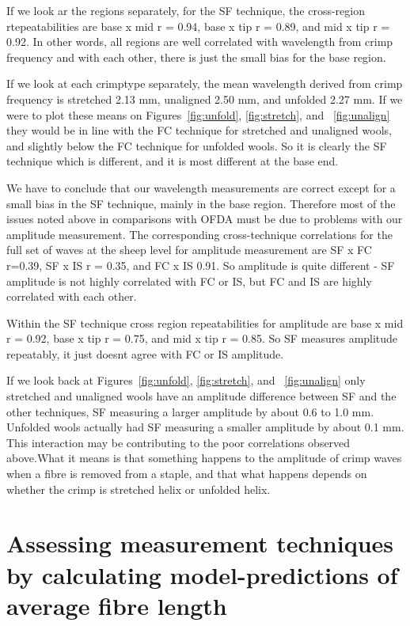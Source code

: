 \documentclass[titlepage,10pt]{article}  %
\begin{document}
If we look ar the regions separately, for the SF technique, the cross-region rtepeatabilities are base x mid r = 0.94, base x tip r = 0.89, and mid x tip r = 0.92. In other words, all regions are well correlated with wavelength from crimp frequency and with each other, there is just the small bias for the base region.

If we look at each crimptype separately, the mean wavelength derived from crimp frequency is stretched 2.13 mm, unaligned 2.50 mm, and unfolded 2.27 mm. If we were to plot these means on Figures~\ref{fig:unfold}, \ref{fig:stretch}, and ~\ref{fig:unalign} they would be in line with the FC technique for stretched and unaligned wools, and slightly below the FC technique for unfolded wools. So it is clearly the SF technique which is different, and it is most different at the base end.

We have to conclude that our wavelength measurements are correct except for a small bias in the SF technique, mainly in the base region. Therefore most of the issues noted above in comparisons with OFDA must be due to problems with our amplitude measurement.  The corresponding cross-technique correlations for the full set of waves at the sheep level for amplitude measurement are SF x FC r=0.39, SF x IS r = 0.35, and FC x IS 0.91. So amplitude is quite different - SF amplitude is not highly correlated with FC or IS, but FC and IS are highly correlated with each other. 

Within the SF technique cross region repeatabilities for amplitude are base x mid r = 0.92, base x tip r = 0.75, and mid x tip r = 0.85. So SF measures amplitude repeatably, it just doesnt agree with FC or IS amplitude.

If we look back at Figures~\ref{fig:unfold}, \ref{fig:stretch}, and ~\ref{fig:unalign} only stretched and unaligned wools have an amplitude difference between SF and the other techniques, SF measuring a larger amplitude  by about 0.6 to 1.0 mm. Unfolded wools actually had SF measuring a smaller amplitude by about 0.1 mm. This interaction may be contributing to the poor correlations observed above.What it means is that something happens to the amplitude of crimp waves when a fibre is removed from a staple, and that what happens depends on whether the crimp is stretched helix or unfolded helix.  



\clearpage
\section{Assessing measurement techniques by calculating model-predictions of average fibre length}
\end{document}
